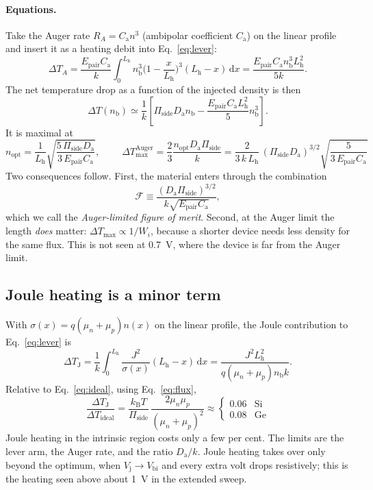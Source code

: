 \documentclass[11pt,a4paper]{article}
\newcommand{\kB}{k_{\mathrm{B}}}
\newcommand{\Ep}{E_{\mathrm{pair}}}
\newcommand{\Vj}{V_{\mathrm{j}}}
\newcommand{\Da}{D_{\mathrm{a}}}
\newcommand{\Ca}{C_{\mathrm{a}}}
\newcommand{\nb}{n_{\mathrm{b}}}
\newcommand{\Pis}{\Pi_{\mathrm{side}}}
\newcommand{\Lh}{L_{\mathrm{h}}}
\newcommand{\dd}{\mathrm{d}}
\begin{document}
\paragraph{Equations.} Take the Auger rate $R_A=\Ca n^3$ (ambipolar coefficient $\Ca$) on the linear profile and insert it as a heating debit into Eq.~\eqref{eq:lever}:
\begin{equation}
  \Delta T_A = \frac{\Ep\Ca}{k}\int_0^{\Lh}\nb^3\Big(1-\frac{x}{\Lh}\Big)^3(\Lh-x)\,\dd x = \frac{\Ep\Ca\nb^3\Lh^2}{5k}. \label{eq:auger}
\end{equation}
The net temperature drop as a function of the injected density is then
\begin{equation}
  \Delta T(\nb)\simeq\frac1k\left[\Pis\Da\nb-\frac{\Ep\Ca\Lh^2}{5}\nb^3\right]. \label{eq:dTn}
\end{equation}
It is maximal at
\begin{equation}
  n_{\mathrm{opt}} = \frac{1}{\Lh}\sqrt{\frac{5\,\Pis\Da}{3\,\Ep\Ca}}, \qquad
  \boxed{\;\Delta T_{\max}^{\mathrm{Auger}} = \frac{2}{3}\frac{n_{\mathrm{opt}}\Da\Pis}{k}
  = \frac{2}{3\,k\,\Lh}\,(\Pis\Da)^{3/2}\sqrt{\frac{5}{3\,\Ep\Ca}}\;} \label{eq:dTmax}
\end{equation}
Two consequences follow. First, the material enters through the combination
\begin{equation}
  \mathcal F \equiv \frac{(\Da\Pis)^{3/2}}{k\sqrt{\Ep\Ca}},  \label{eq:F}
\end{equation}
which we call the \emph{Auger-limited figure of merit}. Second, at the Auger limit the length \emph{does} matter: $\Delta T_{\max}\propto1/W_i$, because a shorter device needs less density for the same flux. This is not seen at \SI{0.7}{\volt}, where the device is far from the Auger limit.

\subsection{Joule heating is a minor term}
With $\sigma(x)=q(\mu_n+\mu_p)n(x)$ on the linear profile, the Joule contribution to Eq.~\eqref{eq:lever} is
\begin{equation}
  \Delta T_{\mathrm J}=\frac1k\int_0^{\Lh}\frac{J^2}{\sigma(x)}(\Lh-x)\,\dd x=\frac{J^2\Lh^2}{q(\mu_n+\mu_p)\nb k}.
\end{equation}
Relative to Eq.~\eqref{eq:ideal}, using Eq.~\eqref{eq:flux},
\begin{equation}
  \frac{\Delta T_{\mathrm J}}{\Delta T_{\mathrm{ideal}}} = \frac{\kB T}{\Pis}\,\frac{2\mu_n\mu_p}{(\mu_n+\mu_p)^2}\approx
  \begin{cases}0.06 & \text{Si}\\ 0.08 & \text{Ge}\end{cases} \label{eq:joule}
\end{equation}
Joule heating in the intrinsic region costs only a few per cent. The limits are the lever arm, the Auger rate, and the ratio $\Da/k$. Joule heating takes over only beyond the optimum, when $\Vj\to V_{\mathrm{bi}}$ and every extra volt drops resistively; this is the heating seen above about \SI{1}{\volt} in the extended sweep.
\end{document}
